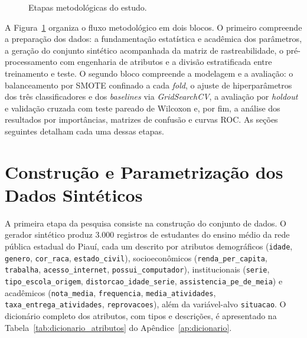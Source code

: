 \begin{figure}[htb]
\centering
\caption{Etapas metodológicas do estudo.}
\label{fig:pipeline}
\end{figure}

A Figura~\ref{fig:pipeline} organiza o fluxo metodológico em dois blocos. O primeiro compreende a preparação dos dados: a fundamentação estatística e acadêmica dos parâmetros, a geração do conjunto sintético acompanhada da matriz de rastreabilidade, o pré-processamento com engenharia de atributos e a divisão estratificada entre treinamento e teste. O segundo bloco compreende a modelagem e a avaliação: o balanceamento por SMOTE confinado a cada \textit{fold}, o ajuste de hiperparâmetros dos três classificadores e dos \textit{baselines} via \textit{GridSearchCV}, a avaliação por \textit{holdout} e validação cruzada com teste pareado de Wilcoxon e, por fim, a análise dos resultados por importâncias, matrizes de confusão e curvas ROC. As seções seguintes detalham cada uma dessas etapas.

\section{Construção e Parametrização dos Dados Sintéticos}

\begin{sloppypar}
A primeira etapa da pesquisa consiste na construção do conjunto de dados. O gerador sintético produz 3.000 registros de estudantes do ensino médio da rede pública estadual do Piauí, cada um descrito por atributos demográficos (\texttt{idade}, \texttt{genero}, \texttt{cor\_raca}, \texttt{estado\_civil}), socioeconômicos (\texttt{renda\_per\_capita}, \texttt{trabalha}, \texttt{acesso\_internet}, \texttt{possui\_computador}), institucionais (\texttt{serie}, \texttt{tipo\_escola\_origem}, \texttt{distorcao\_idade\_serie}, \texttt{assistencia\_pe\_de\_meia}) e acadêmicos (\texttt{nota\_media}, \texttt{frequencia}, \texttt{media\_atividades}, \texttt{taxa\_entrega\_atividades}, \texttt{reprovacoes}), além da variável-alvo \texttt{situacao}. O dicionário completo dos atributos, com tipos e descrições, é apresentado na Tabela~\ref{tab:dicionario_atributos} do Apêndice~\ref{ap:dicionario}.
\end{sloppypar}

